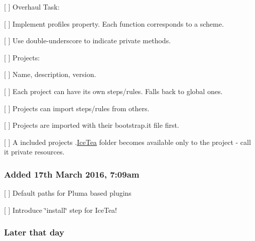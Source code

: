 \begin{DoxyItemize}
\item \mbox{[} \mbox{]} Overhaul {\ttfamily Task}\+:
\begin{DoxyItemize}
\item \mbox{[} \mbox{]} Implement {\ttfamily profiles} property. Each function corresponds to a scheme.
\item \mbox{[} \mbox{]} Use double-\/underscore to indicate private methods.
\end{DoxyItemize}
\item \mbox{[} \mbox{]} {\ttfamily Project}s\+:
\begin{DoxyItemize}
\item \mbox{[} \mbox{]} Name, description, version.
\item \mbox{[} \mbox{]} Each project can have it\textquotesingle{}s own steps/rules. Falls back to global ones.
\item \mbox{[} \mbox{]} Projects can import steps/rules from others.
\item \mbox{[} \mbox{]} Projects are imported with their {\ttfamily bootstrap.\+it} file first.
\item \mbox{[} \mbox{]} A included project\textquotesingle{}s {\ttfamily .\hyperlink{class_ice_tea}{Ice\+Tea}} folder becomes available only to the project -\/ call it private resources.
\end{DoxyItemize}
\end{DoxyItemize}

\subsubsection*{Added 17th March 2016, 7\+:09am}


\begin{DoxyItemize}
\item \mbox{[} \mbox{]} Default paths for Pluma based plugins
\item \mbox{[} \mbox{]} Introduce \char`\"{}install\char`\"{} step for Ice\+Tea! \subsubsection*{Later that day}
\end{DoxyItemize}


